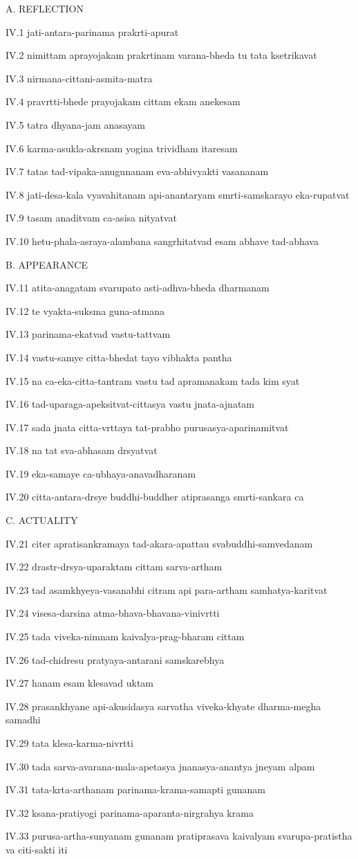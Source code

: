 A. REFLECTION

IV.1
jati-antara-parinama prakrti-apurat

IV.2
nimittam aprayojakam prakrtinam varana-bheda tu tata ksetrikavat

IV.3
nirmana-cittani-asmita-matra

IV.4
pravrtti-bhede prayojakam cittam ekam anekesam

IV.5
tatra dhyana-jam anasayam

IV.6
karma-asukla-akrsnam yogina trividham itaresam

IV.7
tatas tad-vipaka-anugunanam eva-abhivyakti vasananam

IV.8
jati-desa-kala vyavahitanam api-anantaryam smrti-samskarayo eka-rupatvat

IV.9
tasam anaditvam ca-asisa nityatvat

IV.10
hetu-phala-asraya-alambana sangrhitatvad esam abhave tad-abhava

B. APPEARANCE

IV.11
atita-anagatam svarupato asti-adhva-bheda dharmanam

IV.12
te vyakta-suksma guna-atmana

IV.13
parinama-ekatvad vastu-tattvam

IV.14
vastu-samye citta-bhedat tayo vibhakta pantha

IV.15
na ca-eka-citta-tantram vastu tad apramanakam tada kim syat

IV.16
tad-uparaga-apeksitvat-cittasya vastu jnata-ajnatam

IV.17
sada jnata citta-vrttaya tat-prabho purusasya-aparinamitvat

IV.18
na tat sva-abhasam drsyatvat

IV.19
eka-samaye ca-ubhaya-anavadharanam

IV.20
citta-antara-drsye buddhi-buddher atiprasanga smrti-sankara ca

C. ACTUALITY

IV.21
citer apratisankramaya tad-akara-apattau svabuddhi-samvedanam

IV.22
drastr-drsya-uparaktam cittam sarva-artham

IV.23
tad asamkhyeya-vasanabhi citram api para-artham samhatya-karitvat

IV.24
visesa-darsina atma-bhava-bhavana-vinivrtti

IV.25
tada viveka-nimnam kaivalya-prag-bharam cittam

IV.26
tad-chidresu pratyaya-antarani samskarebhya

IV.27
hanam esam klesavad uktam

IV.28
prasankhyane api-akusidasya sarvatha viveka-khyate dharma-megha samadhi

IV.29
tata klesa-karma-nivrtti

IV.30
tada sarva-avarana-mala-apetasya jnanasya-anantya jneyam alpam

IV.31
tata-krta-arthanam parinama-krama-samapti gunanam

IV.32
ksana-pratiyogi parinama-aparanta-nirgrahya krama

IV.33
purusa-artha-sunyanam gunanam pratiprasava kaivalyam
svarupa-pratistha va citi-sakti iti

